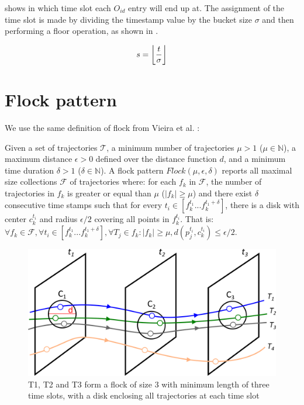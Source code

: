  shows in which time slot each $O_{id}$ entry will end up at. The assignment of the time slot is
made by dividing the timestamp value by the bucket size $\sigma$ and then performing a floor operation, as shown in
.

\begin{equation}
    \label{eq:timeslot}
    s = \floor*{\frac{t}{\sigma}}
\end{equation}

\section{Flock pattern}
\label{sec:tech_flock}
We use the same definition of flock from Vieira et al. \citep{vieira}:

\begin{Def}
\label{def:flock}
Given a set of trajectories $\mathcal{T}$, a minimum number of trajectories $\mu > 1$ ($\mu \in \mathbb{N}$), a maximum
distance $\epsilon > 0$ defined over the distance function $d$, and a minimum time duration $\delta > 1$ ($\delta \in
\mathbb{N}$). A flock pattern $Flock (\mu, \epsilon, \delta)$ reports all maximal size collections $\mathcal{F}$ of
trajectories where: for each $f_k$ in $\mathcal{F}$, the number of trajectories in $f_k$ is greater or equal than $\mu$
($|f_k| \ge \mu$) and there exist $\delta$ consecutive time stamps such that for every $t_i \in [f_k^{t_1}...f_k^{t_1 +
\delta}]$, there is a disk with center $c_k^{t_i}$ and radius $\epsilon/2$ covering all points in $f_k^{t_i}$. That is:
$\forall f_k \in \mathcal{F}, \forall t_i \in [f_k^{t_1}...f_k^{t_1 + \delta}], \forall T_j \in f_k: |f_k | \ge \mu,
d(p_j^{t_i},c_k^{t_i}) \le \epsilon/2$.
\end{Def}

\begin{figure}[h!]
    \centering
    \includegraphics[width=\textwidth]{images/flock_2.png}
    \caption{T1, T2 and T3 form a flock of size 3 with minimum length of three time slots, with a disk enclosing all
        trajectories at each time slot \citep{vieira}}
    \label{fig:flock2}
\end{figure}

